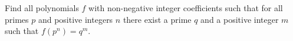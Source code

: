 Find all polynomials $f$ with non-negative integer coefficients such that for all primes $p$ and positive integers $n$ there exist a prime $q$ and a positive integer $m$ such that $f(p^n)=q^m$.